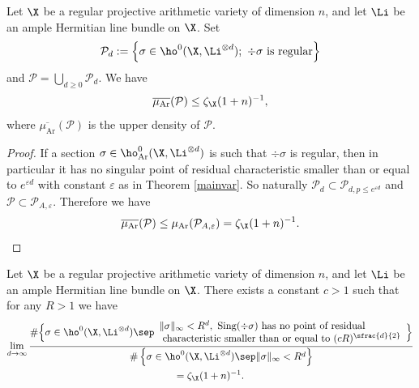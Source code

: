 \begin{thm}\label{regular}
Let $\X$ be a regular projective arithmetic variety of dimension $n$, and let $\Li$ be an ample Hermitian line bundle on $\X$. Set
\[
\mathcal{P}_{d}:=\left\{ \sigma\in \ho^0(\X,\Li^{\otimes d});\
\div \sigma \text{ is regular} \right\}
\]
and $\mathcal{P}=\bigcup_{d\geq 0} \mathcal{P}_{d}$. We have
\[
\overline{\mu_{\mathrm{Ar}}}(\mathcal{P})\leq\zeta_{\X}(1+n)^{-1},
\]
where $\overline{\mu_{\mathrm{Ar}}}(\mathcal{P})$ is the upper density of $\mathcal{P}$.
\end{thm}
\begin{proof}[Proof]
If a section $ \sigma\in \ho_{\mathrm{Ar}}^0(\X,\Li^{\otimes d})$ is such that $\div \sigma$ is regular, then in particular it has no singular point of residual characteristic smaller than or equal to $e^{\varepsilon d}$ with constant $\varepsilon$ as in Theorem \ref{mainvar}. So naturally $\mathcal{P}_d\subset \mathcal{P}_{d, p\leq e^{\varepsilon d}}$ and $\mathcal{P}\subset \mathcal{P}_{A,\varepsilon}$. Therefore we have
\[
\overline{\mu_{\mathrm{Ar}}}(\mathcal{P})\leq \mu_{\mathrm{Ar}}(\mathcal{P}_{A,\varepsilon})=\zeta_{\X}(1+n)^{-1}.\qedhere
\]
\end{proof}

\begin{cor}\label{singR}
Let $\X$ be a regular projective arithmetic variety of dimension $n$, and let $\Li$ be an ample Hermitian line bundle on $\X$.
There exists a constant $c>1$ such that for any $R>1$ we have
\begin{multline*}
\lim_{d\to \infty}\frac{\#\Bigl\{ \sigma\in \ho^0(\X, \Li^{\otimes d})\sep \begin{array}{ll} \lVert \sigma \rVert_{\infty}<R^d,\ \mathrm{Sing}(\div \sigma) \text{ has no point of residual} \\ \text{ characteristic smaller than or equal to } (cR)^{\sfrac{d}{2}} \end{array}\Bigr\}}{\#\left\{ \sigma\in \ho^0(\X, \Li^{\otimes d})\sep \lVert \sigma \rVert_{\infty}<R^d \right\}}\\
=\zeta_{\X}(1+n)^{-1}.
\end{multline*}
\end{cor}

